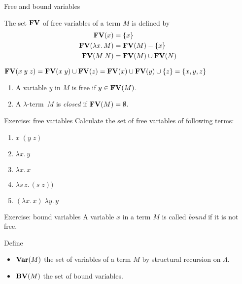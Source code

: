 \begin{frame}{Free and bound variables}
\begin{definition}
  The set $\mathbf{FV}$ of free variables of a term $M$ is defined by
  \begin{align*}
    \mathbf{FV}(x) & = \{x\} \\
    \mathbf{FV}(\lambda x.\, M) & = \mathbf{FV}(M) - \{x\} \\
    \mathbf{FV}(M\;N) & = \mathbf{FV}(M) \cup \mathbf{FV}(N)
  \end{align*}
\end{definition}
$\mathbf{FV}(x\;y\;z) = \mathbf{FV}(x\;y) \cup \mathbf{FV}(z) = \mathbf{FV}(x) \cup \mathbf{FV}(y) \cup \{z\} = \{x, y, z\}$
\begin{definition}
  \begin{enumerate}
    \item A variable $y$ in $M$ is \alert{free} if $y \in \mathbf{FV}(M)$.
    \item A $\lambda$-term~$M$ is \alert{\emph{closed}} if $\mathbf{FV}(M) = \emptyset$. 
  \end{enumerate}
\end{definition}

\end{frame}

\begin{frame}{Exercise: free variables}
  Calculate the set of free variables of following terms:
  \begin{enumerate}
    \item $x\;(y\; z) $
    \item $\lambda x.\, y$
    \item $\lambda x.\, x$
    \item $\lambda s\,z.\, (s \;z))$
    \item $(\lambda x.\, x)\;\lambda y.\, y$
  \end{enumerate}
\end{frame}

\begin{frame}{Exercise: bound variables}
  A variable $x$ in a term $M$ is called \emph{bound} if it is not free.

  Define
  \begin{itemize}
    \item $\mathbf{Var}(M)$ the set of variables of a term $M$ by structural recursion on $\Lambda$.
    \item $\mathbf{BV}(M)$ the set of bound variables.
  \end{itemize}
\end{frame}

